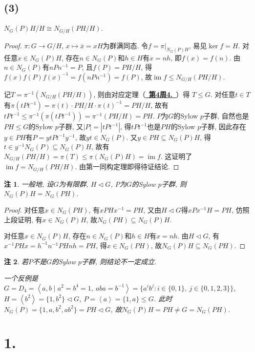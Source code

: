 \documentclass[12pt, a4paper, fontset=windows]{ctexart}
\newcommand{\abs}[1]{\left|{#1}\right|}
\newcommand{\cl}[1]{\overline{#1}} %
\newcommand{\gen}[1]{\left\langle{#1}\right\rangle}
\newcommand{\im}{\operatorname{im}}
\newcommand{\isom}{\cong} %
\newcommand{\kh}[1]{（{#1}）} %
\newcommand{\myref}[2][]{\hyperref[#1]{\color{blue}\ {#2}\ }}
\newtheorem*{remark}{注}
\begin{document}
\subsection*{(3)}

$N_G(P)H/H\isom N_{G/H}(PH/H)$. 

\begin{proof}
$\pi:G\to G/H$, $x\mapsto\cl{x}=xH$为群满同态. 
令$f=\pi|_{N_G(P)H}$, 易见$\ker f=H$. 
对任意$x\in N_G(P)H$, 存在$n\in N_G(P)$和$h\in H$有$x=nh$, 即$f(x)=f(n)$. 
由$n\in N_G(P)$有$nPn^{-1}=P$, 且$f(P)=PH/H$, 得$f(x)f(P)f(x)^{-1}=f(nPn^{-1})=f(P)$, 
故$\im f\le N_{G/H}(PH/H)$. 

记$T=\pi^{-1}(N_{G/H}(PH/H))$, 则由对应定理\kh{\myref[group-correspond]{\bf 第4周4.}}得
$T\le G$. 对任意$t\in T$有$\pi(tPt^{-1})=\pi(t)\cdot PH/H\cdot\pi(t)^{-1}=PH/H$, 
故有$tPt^{-1}\le\pi^{-1}(\pi(tPt^{-1}))=\pi^{-1}(PH/H)=PH$. 
$P$为$G$的Sylow $p$子群, 自然也是$PH\le G$的Sylow $p$子群, 
又$\abs{P}=\abs{tPt^{-1}}$, 得$tPt^{-1}$也是$PH$的Sylow $p$子群, 
因此存在$y\in PH$有$P=ytPt^{-1}y^{-1}$, 故$yt\in N_G(P)$. 
又$y\in PH\subseteq N_G(P)H$, 得$t\in y^{-1}N_G(P)\subseteq N_G(P)H$, 
故有$N_{G/H}(PH/H)=\pi(T)\le\pi(N_G(P)H)=\im f$. 
这证明了$\im f=N_{G/H}(PH/H)$. 由第一同构定理即得待证结论. 
\end{proof}

\begin{remark}
一般地, 设$G$为有限群, $H\lhd G$, $P$为$G$的Sylow $p$子群, 则$N_G(P)H=N_G(PH)$. 
\end{remark}

\begin{proof}
对任意$x\in N_G(PH)$, 有$xPHx^{-1}=PH$, 又由$H\lhd G$得$xPx^{-1}H=PH$, 
仿照上段证明, 有$x\in N_G(P)H$, 故$N_G(PH)\subseteq N_G(P)H$. 

对任意$x\in N_G(P)H$, 存在$n\in N_G(P)$和$h\in H$有$x=nh$. 
由$H\lhd G$, 有$x^{-1}PHx=h^{-1}n^{-1}PHnh=PH$, 得$x\in N_G(PH)$, 
故$N_G(P)H\subseteq N_G(PH)$. 
\end{proof}

\begin{remark}
若$P$不是$G$的Sylow $p$子群, 则结论不一定成立. 

一个反例是$G=D_4=\gen{a,b\mid a^2=b^4=1,\ aba=b^{-1}}
=\{a^ib^j:i\in\{0,1\},\ j\in\{0,1,2,3\}\}$, 
$H=\gen{b^2}=\{1,b^2\}\lhd G$, $P=\gen{a}=\{1,a\}\le G$. 
此时$N_G(P)=\{1,a,b^2,ab^2\}=PH\lhd G$, 
故$N_G(P)H=PH\ne G=N_G(PH)$. 
\end{remark}

\section*{1.}
\end{document}
